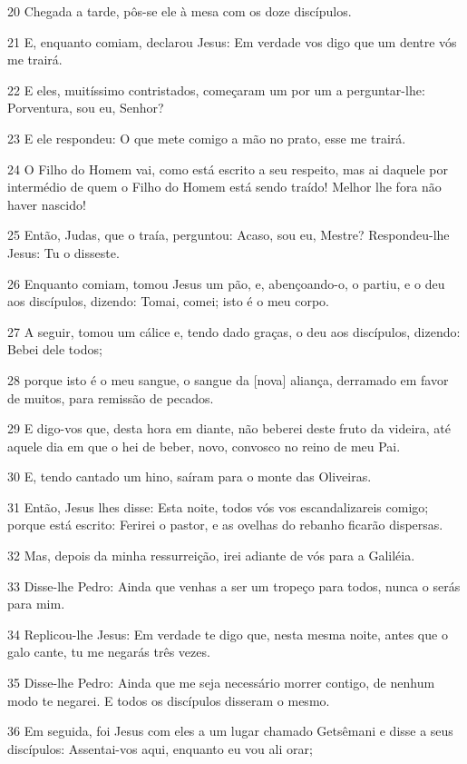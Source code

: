 \par 20 Chegada a tarde, pôs-se ele à mesa com os doze discípulos.
\par 21 E, enquanto comiam, declarou Jesus: Em verdade vos digo que um dentre vós me trairá.
\par 22 E eles, muitíssimo contristados, começaram um por um a perguntar-lhe: Porventura, sou eu, Senhor?
\par 23 E ele respondeu: O que mete comigo a mão no prato, esse me trairá.
\par 24 O Filho do Homem vai, como está escrito a seu respeito, mas ai daquele por intermédio de quem o Filho do Homem está sendo traído! Melhor lhe fora não haver nascido!
\par 25 Então, Judas, que o traía, perguntou: Acaso, sou eu, Mestre? Respondeu-lhe Jesus: Tu o disseste.
\par 26 Enquanto comiam, tomou Jesus um pão, e, abençoando-o, o partiu, e o deu aos discípulos, dizendo: Tomai, comei; isto é o meu corpo.
\par 27 A seguir, tomou um cálice e, tendo dado graças, o deu aos discípulos, dizendo: Bebei dele todos;
\par 28 porque isto é o meu sangue, o sangue da [nova] aliança, derramado em favor de muitos, para remissão de pecados.
\par 29 E digo-vos que, desta hora em diante, não beberei deste fruto da videira, até aquele dia em que o hei de beber, novo, convosco no reino de meu Pai.
\par 30 E, tendo cantado um hino, saíram para o monte das Oliveiras.
\par 31 Então, Jesus lhes disse: Esta noite, todos vós vos escandalizareis comigo; porque está escrito: Ferirei o pastor, e as ovelhas do rebanho ficarão dispersas.
\par 32 Mas, depois da minha ressurreição, irei adiante de vós para a Galiléia.
\par 33 Disse-lhe Pedro: Ainda que venhas a ser um tropeço para todos, nunca o serás para mim.
\par 34 Replicou-lhe Jesus: Em verdade te digo que, nesta mesma noite, antes que o galo cante, tu me negarás três vezes.
\par 35 Disse-lhe Pedro: Ainda que me seja necessário morrer contigo, de nenhum modo te negarei. E todos os discípulos disseram o mesmo.
\par 36 Em seguida, foi Jesus com eles a um lugar chamado Getsêmani e disse a seus discípulos: Assentai-vos aqui, enquanto eu vou ali orar;
